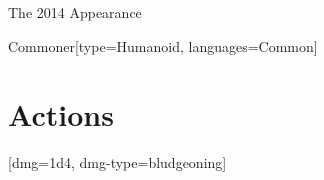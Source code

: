 \begin{ExampleBlock}{The 2014 Appearance}
{
    \RpgStatLegacyMode{}
    \begin{RpgStat}{Commoner}[type=Humanoid, languages=Common]
        \section{Actions}
            [dmg=1d4, dmg-type=bludgeoning]
    \end{RpgStat}
}


\end{ExampleBlock}
